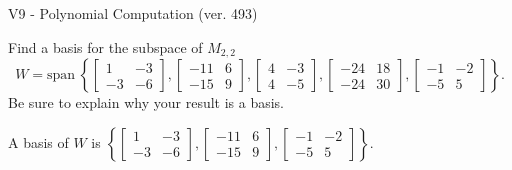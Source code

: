 \begin{exercise}
  \begin{exerciseTitle}V9 - Polynomial Computation (ver. 493)\end{exerciseTitle}
  \begin{exerciseStatement}
    Find a basis for the subspace of \(M_{2,2}\) 
\[W=\mathrm{span}\ \left\{\left[\begin{array}{cc}
1 & -3 \\
-3 & -6
\end{array}\right] , \left[\begin{array}{cc}
-11 & 6 \\
-15 & 9
\end{array}\right] , \left[\begin{array}{cc}
4 & -3 \\
4 & -5
\end{array}\right] , \left[\begin{array}{cc}
-24 & 18 \\
-24 & 30
\end{array}\right] , \left[\begin{array}{cc}
-1 & -2 \\
-5 & 5
\end{array}\right]\right\}.\]
 Be sure to explain why your result is a basis.


  \end{exerciseStatement}
  \begin{exerciseAnswer}
   A basis of \(W\) is  \(\left\{\left[\begin{array}{cc}
1 & -3 \\
-3 & -6
\end{array}\right] , \left[\begin{array}{cc}
-11 & 6 \\
-15 & 9
\end{array}\right] , \left[\begin{array}{cc}
-1 & -2 \\
-5 & 5
\end{array}\right]\right\}\).
  


  \end{exerciseAnswer}
\end{exercise}